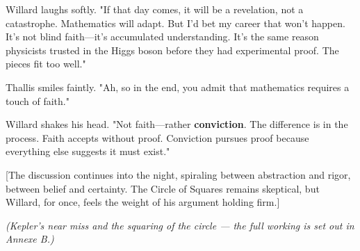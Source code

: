 Willard laughs softly.  
"If that day comes, it will be a revelation, not a catastrophe. Mathematics will adapt. But I’d bet my career that won’t happen. It’s not blind faith—it’s accumulated understanding. It’s the same reason physicists trusted in the Higgs boson before they had experimental proof. The pieces fit too well."

\smallskip

Thallis smiles faintly.  
"Ah, so in the end, you admit that mathematics requires a touch of faith."

\smallskip

Willard shakes his head.  
"Not faith—rather \textbf{conviction}. The difference is in the process. Faith accepts without proof. Conviction pursues proof because everything else suggests it must exist."

\smallskip

[The discussion continues into the night, spiraling between abstraction and rigor, between belief and certainty. The Circle of Squares remains skeptical, but Willard, for once, feels the weight of his argument holding firm.]

\textit{(Kepler's near miss and the squaring of the circle --- the full working is set out in Annexe B.)}

